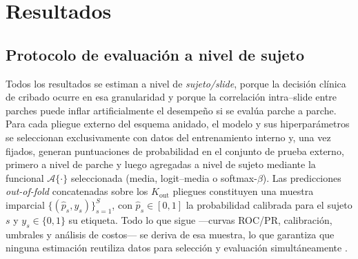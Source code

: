 \chapter{Resultados}
\label{chap:resultados}

\section*{Protocolo de evaluación a nivel de sujeto}
Todos los resultados se estiman a nivel de \emph{sujeto/slide}, porque la decisión clínica de cribado ocurre en esa granularidad y porque la correlación intra–slide entre parches puede inflar artificialmente el desempeño si se evalúa parche a parche. Para cada pliegue externo del esquema anidado, el modelo y sus hiperparámetros se seleccionan exclusivamente con datos del entrenamiento interno y, una vez fijados, generan puntuaciones de probabilidad en el conjunto de prueba externo, primero a nivel de parche y luego agregadas a nivel de sujeto mediante la funcional $\mathcal{A}\{\cdot\}$ seleccionada (media, logit–media o softmax-$\beta$). Las predicciones \emph{out-of-fold} concatenadas sobre los $K_\text{out}$ pliegues constituyen una muestra imparcial $\{(\hat{p}_s,y_s)\}_{s=1}^{S}$, con $\hat{p}_s\in[0,1]$ la probabilidad calibrada para el sujeto $s$ y $y_s\in\{0,1\}$ su etiqueta. Todo lo que sigue —curvas ROC/PR, calibración, umbrales y análisis de costos— se deriva de esa muestra, lo que garantiza que ninguna estimación reutiliza datos para selección y evaluación simultáneamente \cite{Tsamardinos2022Patterns}.

